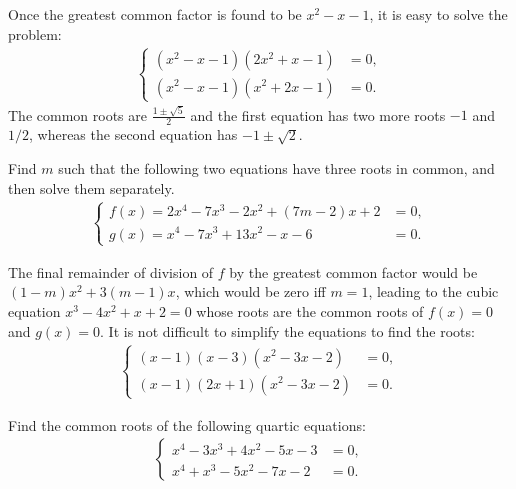 \begin{solution}
    Once the greatest common factor is found to be $x^2-x-1$,  it is easy to solve the problem:
    \begin{align*}
        \begin{cases}
            (x^2-x-1)(2x^2+x-1)&=0,\\(x^2-x-1)(x^2+2x-1)&=0.
        \end{cases}
    \end{align*}
    The common roots are $\frac{1\pm\sqrt{5}}{2}$ and the first equation has two more roots $-1$ and $1/2$, whereas the second equation has $-1\pm\sqrt{2}$. 
\end{solution}


\begin{question}
    Find $m$ such that the following two equations have three roots in common, and then solve them separately.
    \begin{align*}
        \begin{cases}
            f(x)=2x^4-7x^3-2x^2+(7m-2)x+2&=0,\\g(x)=x^4-7x^3+13x^2-x-6&=0.
        \end{cases}
    \end{align*}
\end{question}

\begin{solution}
    The final remainder of division of $f$ by the greatest common factor would be $(1-m)x^2+3(m-1)x$, which would be zero iff $m=1$, leading to the cubic equation $x^3-4x^2+x+2=0$ whose roots are the common roots of $f(x)=0$ and $g(x)=0$. It is not difficult to simplify the equations to find the roots:
    \begin{align*}
        \begin{cases}
            (x-1)(x-3)(x^2-3x-2)&=0,\\(x-1)(2x+1)(x^2-3x-2)&=0.
        \end{cases}
    \end{align*}
\end{solution}


\begin{question}
    Find the common roots of the following quartic equations:
    \begin{align*}
        \begin{cases}
            x^4-3x^3+4x^2-5x-3 &=0,\\x^4+x^3-5x^2-7x-2 &=0.
        \end{cases}
    \end{align*}
\end{question}

